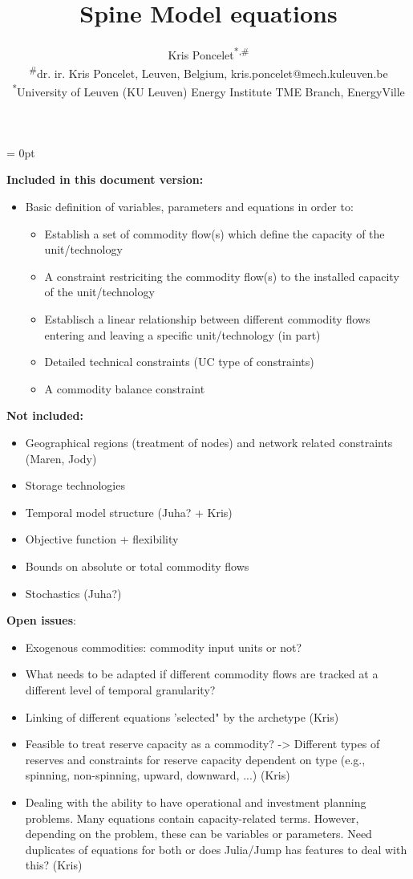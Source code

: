 \documentclass[10pt,english]{article}
\title{Spine Model equations}
\date{}
\author{Kris Poncelet\textsuperscript{*,\#}\\ 
{\small \textsuperscript{\#}dr. ir. Kris Poncelet, Leuven, Belgium, kris.poncelet@mech.kuleuven.be} \\
{\small \textsuperscript{*}University of Leuven (KU Leuven) Energy Institute TME Branch, EnergyVille}}
\begin{document}
\voffset = 0pt

\maketitle{}


\textbf{Included in this document version:}
\begin{itemize}
\item Basic definition of variables, parameters and equations in order to:
\begin{itemize}
\item Establish a set of commodity flow(s) which define the capacity of the unit/technology 
\item A constraint restriciting the commodity flow(s) to the installed capacity of the unit/technology
\item Establisch a linear relationship between different commodity flows entering and leaving a specific unit/technology (in part)
\item Detailed technical constraints (UC type of constraints)
\item A commodity balance constraint
\end{itemize} 
\end{itemize} 


\textbf{Not included:}
\begin{itemize}
\item Geographical regions (treatment of nodes) and network related constraints (Maren, Jody)
\item Storage technologies
\item Temporal model structure (Juha? + Kris)
\item Objective function + flexibility
\item Bounds on absolute or total commodity flows
\item Stochastics (Juha?)
\end{itemize} 

\textbf{Open issues}: 
\begin{itemize}
\item Exogenous commodities: commodity input units or not?
\item What needs to be adapted if different commodity flows are tracked at a different level of temporal granularity?
\item Linking of different equations 'selected" by the archetype (Kris)
\item Feasible to treat reserve capacity as a commodity? -> Different types of reserves and constraints for reserve capacity dependent on type (e.g., spinning, non-spinning, upward, downward, ...) (Kris)
\item Dealing with the ability to have operational and investment planning problems. Many equations contain capacity-related terms. However, depending on the problem, these can be variables or parameters. Need duplicates of equations for both or does Julia/Jump has features to deal with this? (Kris)
\end{itemize}
\end{document}
